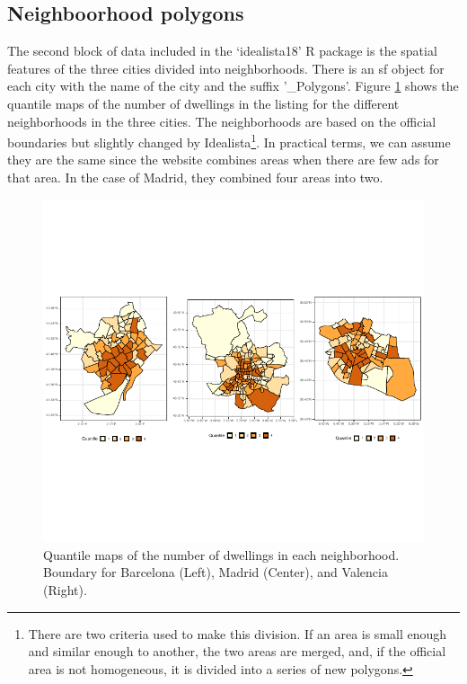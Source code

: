 \documentclass[Royal,times,sageh]{sagej}
\begin{document}
\hypertarget{neighboorhood-polygons}{%
\subsection{Neighboorhood polygons}\label{neighboorhood-polygons}}

The second block of data included in the `idealista18' R package is the
spatial features of the three cities divided into neighborhoods. There
is an sf object for each city with the name of the city and the suffix
'\_Polygons'. Figure \ref{fig:all-polygons} shows the quantile maps of
the number of dwellings in the listing for the different neighborhoods
in the three cities. The neighborhoods are based on the official
boundaries but slightly changed by
Idealista\footnote{There are two criteria used to make this division. If an area is small enough and similar enough to another, the two areas are merged, and, if the official area is not homogeneous, it is divided into a series of new polygons.}.
In practical terms, we can assume they are the same since the website
combines areas when there are few ads for that area. In the case of
Madrid, they combined four areas into two.

\begin{figure}
\centering
\includegraphics{main_EPB_v0_files/figure-latex/unnamed-chunk-1-1.pdf}
\caption{\label{fig:all-polygons}Quantile maps of the number of
dwellings in each neighborhood. Boundary for Barcelona (Left), Madrid
(Center), and Valencia (Right).}
\end{figure}
\end{document}
